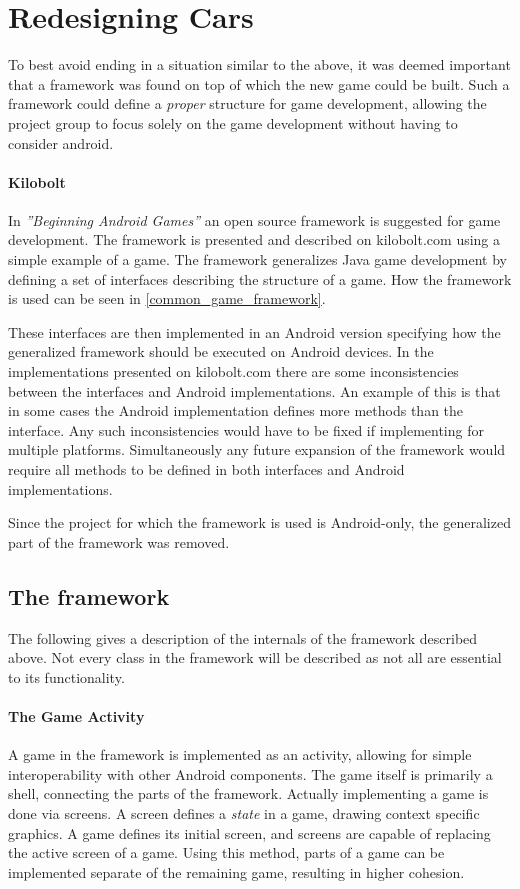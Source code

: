 \section{Redesigning Cars}\label{s1_redesign}
To best avoid ending in a situation similar to the above, it was deemed important that a framework was found on top of which the new game could be built.
Such a framework could define a \textit{proper} structure for game development, allowing the project group to focus solely on the game development without having to consider android.

\paragraph{Kilobolt}\label{kilobolt:description}
In \textit{''Beginning Android Games''}\cite{androidgames} an open source framework is suggested for game development.
The framework is presented and described on kilobolt.com\cite{kilobolt} using a simple example of a game.
The framework generalizes Java game development by defining a set of interfaces describing the structure of a game.
How the framework is used can be seen in \cref{common_game_framework}.

These interfaces are then implemented in an Android version specifying how the generalized framework should be executed on Android devices.
In the implementations presented on kilobolt.com there are some inconsistencies between the interfaces and Android implementations.
An example of this is that in some cases the Android implementation defines more methods than the interface.
Any such inconsistencies would have to be fixed if implementing for multiple platforms.
Simultaneously any future expansion of the framework would require all methods to be defined in both interfaces and Android implementations. 

Since the project for which the framework is used is Android-only, the generalized part of the framework was removed.

\subsection{The framework}
The following gives a description of the internals of the framework described above.
Not every class in the framework will be described as not all are essential to its functionality.
\paragraph{The Game Activity}
A game in the framework is implemented as an activity, allowing for simple interoperability with other Android components.
The game itself is primarily a shell, connecting the parts of the framework.
Actually implementing a game is done via screens.
A screen defines a \textit{state} in a game, drawing context specific graphics.
A game defines its initial screen, and screens are capable of replacing the active screen of a game.
Using this method, parts of a game can be implemented separate of the remaining game, resulting in higher cohesion.

